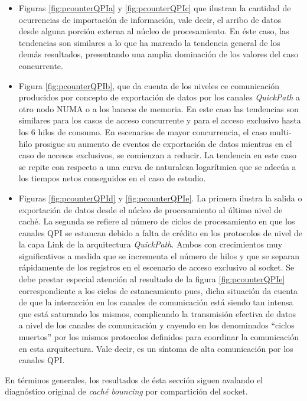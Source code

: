\begin{itemize}
\item Figuras \ref{fig:pcounterQPIa} y \ref{fig:pcounterQPIc} que ilustran la cantidad de ocurrencias de importación de información, vale decir, el arribo de datos desde alguna porción externa al núcleo de procesamiento. En éste caso, las tendencias son similares a lo que ha marcado la tendencia general de los demás resultados, presentando una amplia dominación de los valores del caso concurrente.
\item Figura \ref{fig:pcounterQPIb}, que da cuenta de los niveles ce comunicación producidos por concepto de exportación de datos por los canales \emph{QuickPath} a otro nodo NUMA o a los bancos de memoria. En este caso las tendencias son similares para los casos de acceso concurrente y para el acceso exclusivo hasta los 6 hilos de consumo. En escenarios de mayor concurrencia, el caso multi-hilo prosigue su aumento de eventos de exportación de datos mientras en el caso de accesos exclusivos, se comienzan a reducir. La tendencia en este caso se repite con respecto a una curva de naturaleza logarítmica que se adecúa a los tiempos netos conseguidos en el caso de estudio.
\item Figuras \ref{fig:pcounterQPId} y \ref{fig:pcounterQPIe}. La primera ilustra la salida o exportación de datos desde el núcleo de procesamiento al último nivel de caché. La segunda se refiere al número de ciclos de procesamiento en que los canales QPI se estancan debido a falta de crédito en los protocolos de nivel de la capa Link de la arquitectura \emph{QuickPath}. Ambos con crecimientos muy significativos a medida que se incrementa el número de hilos y que se separan rápidamente de los registros en el escenario de acceso exclusivo al socket. Se debe prestar especial atención al resultado de la figura \ref{fig:pcounterQPIe} correspondiente a los ciclos de estancamiento pues, dicha situación da cuenta de que la interacción en los canales de comunicación está siendo tan intensa que está saturando los mismos, complicando la transmisión efectiva de datos a nivel de los canales de comunicación y cayendo en los denominados “ciclos muertos” por los mismos protocolos definidos para coordinar la comunicación en esta arquitectura. Vale decir, es un síntoma de alta comunicación por los canales QPI.
\end{itemize}
En términos generales, los resultados de ésta sección siguen avalando el diagnóstico original de \emph{caché bouncing} por compartición del socket.

